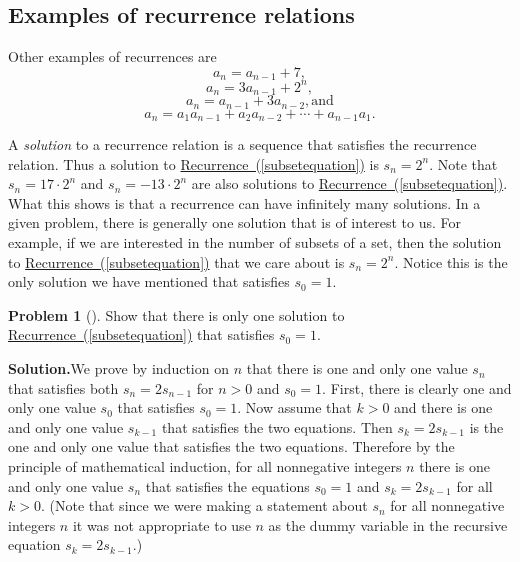 \documentclass[10pt,]{book}
\theoremstyle{plain}
\theoremstyle{definition}
\newtheorem{activity}[project]{Problem}
\theoremstyle{definition}
\numberwithin{equation}{chapter}
\begin{document}
\subsection[{Examples of recurrence relations}]{Examples of recurrence relations}\label{subsection-11}
Other examples of recurrences are%
\begin{equation}
a_n = a_{n-1} +
7,\label{arithmeticexample}
\end{equation}
%
\begin{equation}
a_n =3a_{n-1} + 2^n,\label{geometricdriven}
\end{equation}
%
\begin{equation}
a_n = a_{n-1} + 3a_{n-2},\mbox{
and}\label{secondorderlinear}
\end{equation}
%
\begin{equation}
a_n= a_1a_{n-1} + a_2a_{n-2}+\cdots +
a_{n-1}a_1.\label{Catalanrecurrence}
\end{equation}
%
\par
A \emph{solution} to a recurrence relation is a sequence that satisfies the recurrence relation. Thus a solution to \hyperref[subsetequation]{Recurrence~(\ref{subsetequation})} is \(s_n =2^n\). Note that \(s_n=17\cdot2^n\) and \(s_n=-13\cdot2^n\) are also solutions to \hyperref[subsetequation]{Recurrence~(\ref{subsetequation})}. What this shows is that a recurrence can have infinitely many solutions. In a given problem, there is generally one solution that is of interest to us. For example, if we are interested in the number of subsets of a set, then the solution to \hyperref[subsetequation]{Recurrence~(\ref{subsetequation})} that we care about is \(s_n=2^n\). Notice this is the only solution we have mentioned that satisfies \(s_0=1\).%
\begin{activity}[]\label{activity-89}
Show that there is only one solution to \hyperref[subsetequation]{Recurrence~(\ref{subsetequation})} that satisfies \(s_0=1\).%
\par\medskip\noindent%
\textbf{Solution.}\quad We prove by induction on \(n\) that there is one and only one value \(s_n\) that satisfies both \(s_n=2s_{n-1}\) for \(n>0\) and \(s_0=1\). First, there is clearly one and only one value \(s_0\) that satisfies \(s_0=1\). Now assume that \(k>0\) and there is one and only one value \(s_{k-1}\) that satisfies the two equations. Then \(s_k=2s_{k-1}\) is the one and only one value that satisfies the two equations. Therefore by the principle of mathematical induction, for all nonnegative integers \(n\) there is one and only one value \(s_n\) that satisfies the equations \(s_0=1\) and \(s_k=2s_{k-1}\) for all \(k>0\). (Note that since we were making a statement about \(s_n\) for all nonnegative integers \(n\) it was not appropriate to use \(n\) as the dummy variable in the recursive equation \(s_k=2s_{k-1}\).)%
\end{activity}
\end{document}
